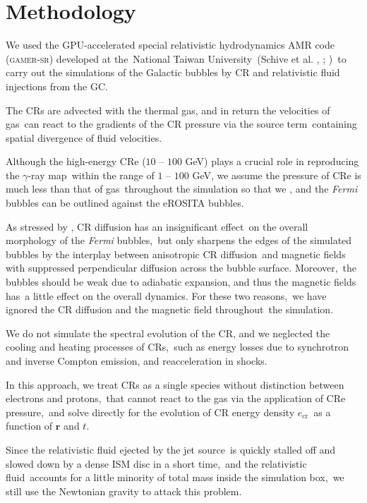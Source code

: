 \documentclass[twocolumn]{aastex631}
\begin{document}
\section{Methodology}
\label{Methodology}
  We used the GPU-accelerated special relativistic hydrodynamics AMR code (\textsc{gamer-sr}) developed at the\
  National Taiwan University\
  (Schive et al. \citeyear{gamer-1}, \citeyear{gamer-2}; \citeauthor{tseng2021} \citeyear{tseng2021})\
  to carry out the simulations of the Galactic bubbles by CR and relativistic fluid injections from the GC.

  The CRs are advected with the thermal gas, and in return the velocities of gas\
  can react to the gradients of the CR pressure via the source term\
  containing spatial divergence of fluid velocities.\

  Although the high-energy CRe ($10$ -- $100$ GeV) plays a crucial role in reproducing the $\gamma$-ray map\
  within the range of $1$ -- $100$ GeV, we assume the pressure of CRe is much less than that of gas\
  throughout the simulation so that we , and the \textit{Fermi} bubbles can be outlined against the eROSITA bubbles.

  As stressed by \citet{Yang2012}, CR diffusion has an insignificant effect\
  on the overall morphology of the \textit{Fermi} bubbles,\
  but only sharpens the edges of the simulated bubbles by the interplay between anisotropic CR diffusion\
  and magnetic fields with suppressed perpendicular diffusion across the bubble surface. Moreover,\
  the bubbles should be weak due to adiabatic expansion, and thus the magnetic fields has\
  a little effect on the overall dynamics. For these two reasons,\
  we have ignored the CR diffusion and the magnetic field throughout\
  the simulation.

  We do not simulate the spectral evolution of the CR, and we neglected the cooling and heating processes of CRs,\
  such as energy losses due to synchrotron and inverse Compton emission, and reacceleration in shocks.\

  In this approach, we treat CRs as a single species without distinction between electrons and protons,\
  that cannot react to the gas via the application of CRe pressure,\
  and solve directly for the evolution of CR energy density $e_{\text{cr}}$\
  as a function of $\mathbf{r}$ and $t$.\

  Since the relativistic fluid ejected by the jet source\
  is quickly stalled off and slowed down by a dense ISM disc in a short time,\
  and the relativistic fluid\
  accounts for a little minority of total mass inside the simulation box,\
  we still use the Newtonian gravity to attack this problem.
\end{document}
